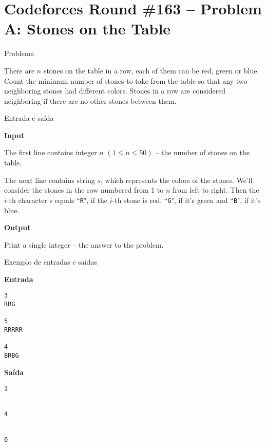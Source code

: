 \section{Codeforces Round \#163 -- Problem A: Stones on the Table}

\begin{frame}[fragile]{Problema}

There are $n$ stones on the table in a row, each of them can be red, green or blue. Count the minimum number of stones to take from the table so that any two neighboring stones had different colors. Stones in a row are considered neighboring if there are no other stones between them.

\end{frame}

\begin{frame}[fragile]{Entrada e saída}

\textbf{Input}

The first line contains integer $n$ $(1\leq n\leq 50)$ -- the number of stones on the table.

The next line contains string $s$, which represents the colors of the stones. We'll consider the 
stones in the row numbered from 1 to $n$ from left to right. Then the $i$-th character s equals 
``\texttt{R}", if the $i$-th stone is red, ``\texttt{G}", if it's green and ``\texttt{B}", 
if it's blue.

\textbf{Output}

Print a single integer -- the answer to the problem.

\end{frame}

\begin{frame}[fragile]{Exemplo de entradas e saídas}

\begin{minipage}[t]{0.5\textwidth}
\textbf{Entrada}
\begin{verbatim}
3
RRG

5
RRRRR

4
BRBG
\end{verbatim}
\end{minipage}
\begin{minipage}[t]{0.45\textwidth}
\textbf{Saída}
\begin{verbatim}
1


4


0
\end{verbatim}
\end{minipage}
\end{frame}

